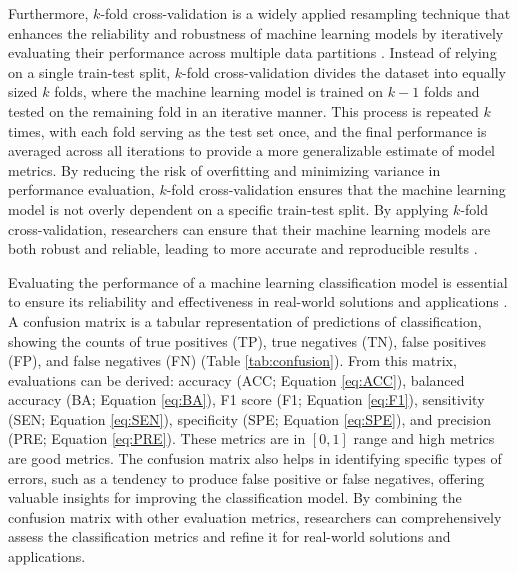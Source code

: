\documentclass[11pt, a4paper, onecolumn, oneside]{report}
\begin{document}
        Furthermore, $k$-fold cross-validation is a widely applied resampling technique that enhances the reliability and robustness of machine learning models by iteratively evaluating their performance across multiple data partitions \cite{Kfold-1, Kfold-2}. Instead of relying on a single train-test split, $k$-fold cross-validation divides the dataset into equally sized $k$ folds, where the machine learning model is trained on $k-1$ folds and tested on the remaining fold in an iterative manner. This process is repeated $k$ times, with each fold serving as the test set once, and the final performance is averaged across all iterations to provide a more generalizable estimate of model metrics. By reducing the risk of overfitting and minimizing variance in performance evaluation, $k$-fold cross-validation ensures that the machine learning model is not overly dependent on a specific train-test split. By applying $k$-fold cross-validation, researchers can ensure that their machine learning models are both robust and reliable, leading to more accurate and reproducible results \cite{Kfold-3}.

        Evaluating the performance of a machine learning classification model is essential to ensure its reliability and effectiveness in real-world solutions and applications \cite{classification-evaluation-1, classification-evaluation-5, classification-evaluation-6}. A confusion matrix is a tabular representation of predictions of classification, showing the counts of true positives (TP), true negatives (TN), false positives (FP), and false negatives (FN) (Table \ref{tab:confusion}). From this matrix, evaluations can be derived: accuracy (ACC; Equation \ref{eq:ACC}), balanced accuracy (BA; Equation \ref{eq:BA}), F1 score (F1; Equation \ref{eq:F1}), sensitivity (SEN; Equation \ref{eq:SEN}), specificity (SPE; Equation \ref{eq:SPE}), and precision (PRE; Equation \ref{eq:PRE}). These metrics are in $[0, 1]$ range and high metrics are good metrics. The confusion matrix also helps in identifying specific types of errors, such as a tendency to produce false positive or false negatives, offering valuable insights for improving the classification model. By combining the confusion matrix with other evaluation metrics, researchers can comprehensively assess the classification metrics and refine it for real-world solutions and applications.
\end{document}
